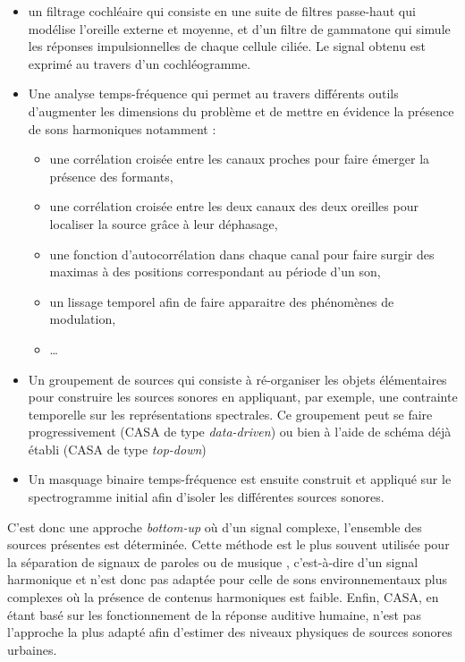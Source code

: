 \begin{itemize}
\item un filtrage cochléaire qui consiste en une suite de filtres passe-haut qui modélise l'oreille externe et moyenne, et d'un filtre de gammatone qui simule les réponses impulsionnelles de chaque cellule ciliée. Le signal obtenu est exprimé au travers d'un cochléogramme.
\item Une analyse temps-fréquence qui permet au travers différents outils d'augmenter les dimensions du problème et de mettre en évidence la présence de sons harmoniques notamment : 
\begin{itemize}[label=$\bullet$]
\item une corrélation croisée entre les canaux proches pour faire émerger la présence des formants, 
\item une corrélation croisée entre les deux canaux des deux oreilles pour localiser la source grâce à leur déphasage,
\item une fonction d'autocorrélation dans chaque canal pour faire surgir des maximas à des positions correspondant au période d'un son,
\item un lissage temporel afin de faire apparaitre des phénomènes de modulation,
\item \dots 
\end{itemize}
\item Un groupement de sources qui consiste à ré-organiser les objets élémentaires pour construire les sources sonores en appliquant, par exemple, une contrainte temporelle  sur les représentations spectrales. Ce groupement peut se faire progressivement (CASA de type \textit{data-driven}) ou bien à l'aide de schéma déjà établi (CASA de type \textit{top-down})
\item Un masquage binaire temps-fréquence est ensuite construit et appliqué sur le spectrogramme initial afin d'isoler les différentes sources sonores.\\
\end{itemize}

C'est donc une approche \textit{bottom-up} où d'un signal complexe, l'ensemble des sources présentes est déterminée.  Cette méthode est le plus souvent utilisée pour la séparation de signaux de paroles \cite{brown2005separation, shao2010computational} ou de musique \cite{martin1998toward}, c'est-à-dire d'un signal harmonique et n'est donc pas adaptée pour celle de sons environnementaux plus complexes où la présence de contenus harmoniques est faible. Enfin, CASA, en étant basé sur les fonctionnement de la réponse auditive humaine, n'est pas l'approche la plus adapté afin d'estimer des niveaux physiques de sources sonores urbaines.


